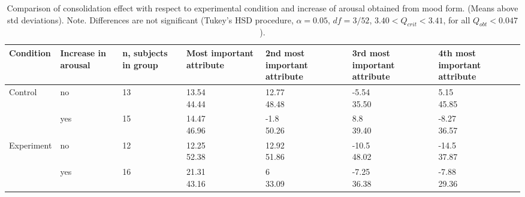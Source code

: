 



\begin{table*}
  \centering
  \small
  \begingroup
    \begin{tabularx}{\textwidth}{XXXXXXX}
      \toprule

      Condition
      & Increase in arousal
      & n, subjects in group
      & Most important attribute
      & 2nd most important attribute
      & 3rd most important attribute
      & 4th most important attribute
      \\

      \midrule


      Control
      & no
      & 13
      & \cellcontent{13.54\\44.44}
      & \cellcontent{12.77\\48.48}
      & \cellcontent{-5.54\\35.50}
      & \cellcontent{5.15\\45.85}
      \\

      & yes
      & 15
      & \cellcontent{14.47\\46.96}
      & \cellcontent{-1.8\\50.26}
      & \cellcontent{8.8\\39.40}
      & \cellcontent{-8.27\\36.57}
      \\

      Experiment
      & no
      & 12
      & \cellcontent{12.25\\52.38}
      & \cellcontent{12.92\\51.86}
      & \cellcontent{-10.5\\48.02}
      & \cellcontent{-14.5\\37.87}
      \\

      & yes
      & 16
      & \cellcontent{21.31\\43.16}
      & \cellcontent{6\\33.09}
      & \cellcontent{-7.25\\36.38}
      & \cellcontent{-7.88\\29.36}
      \\

      \bottomrule
    \end{tabularx}
    \endgroup
  \caption{Comparison of consolidation effect with respect to
    experimental condition and increase of arousal obtained from mood
    form. (Means above std deviations). Note. Differences are not
    significant (Tukey's HSD procedure, $\alpha=0.05$, $df = 3/52$,
    $3.40 < Q_{crit} < 3.41$, for all $Q_{obt}<0.047$).}
  \label{tab:arousal}
\end{table*}



